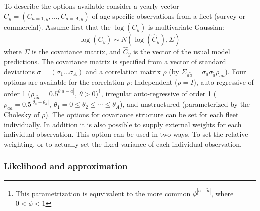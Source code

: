 \documentclass[12pt,letterpaper, leqno]{article}
\begin{document}
To describe the options available consider a yearly vector $C_y=(C_{a=1,y},\ldots,C_{a=A,y})$ of age specific observations from a fleet (survey or commercial). Assume first that the $\log(C_y)$ is multivariate Gaussian: 
\[
\log(C_y) \sim N(\log(\widehat{C}_y), \Sigma)
\]   
where $\Sigma$ is the covariance matrix, and $\hat{C}_y$ is the vector of the usual model predictions. The covariance matrix is specified from a vector of standard deviations $\sigma=(\sigma_1\ldots\sigma_A)$ and a correlation matrix $\rho$ (by $\Sigma_{a\tilde{a}}=\sigma_a\sigma_{\tilde{a}}\rho_{a\tilde{a}}$). Four options are available for the correlation $\rho$: Independent ($\rho=I$), auto-regressive of order 1 ($\rho_{a\tilde{a}}=0.5^{\theta|a-\tilde{a}|}, \ \theta>0$)\footnote[$\star$]{This parametrization is equvivalent to the more common $\phi^{|a-\tilde{a}|}$, where $0<\phi<1$}, irregular auto-regressive of order 1 ($\rho_{a\tilde{a}}=0.5^{|\theta_a-\theta_{\tilde{a}}|}, \ \theta_1=0\leq\theta_2\leq\cdots\leq\theta_A$), and unstructured (parameterized by the Cholesky of $\rho$). The options for covariance structure can be set for each fleet individually. In addition it is also possible to supply external weights for each individual observation. This option can be used in two ways. To set the relative weighting, or to actually set the fixed variance of each individual observation.

\subsubsection*{Likelihood and approximation}
\end{document}
